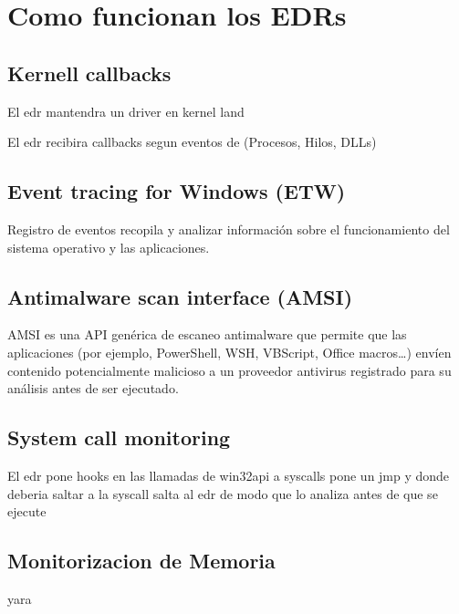 \section{Como funcionan los EDRs}

\subsection{Kernell callbacks}

El edr mantendra un driver en kernel land

El edr recibira callbacks segun eventos de (Procesos, Hilos, DLLs)

\subsection{Event tracing for Windows (ETW)}

Registro de eventos recopila y analizar información sobre el funcionamiento 
del sistema operativo y las aplicaciones.

\subsection{Antimalware scan interface (AMSI)}

AMSI es una API genérica de escaneo antimalware que permite que las aplicaciones
(por ejemplo, PowerShell, WSH, VBScript, Office macros…) envíen contenido 
potencialmente malicioso a un proveedor antivirus registrado para su análisis 
antes de ser ejecutado.

\subsection{System call monitoring}

El edr pone hooks en las llamadas de win32api a syscalls
pone un jmp y donde deberia saltar a la syscall salta al edr de modo que lo 
analiza antes de que se ejecute

\subsection{Monitorizacion de Memoria}

yara